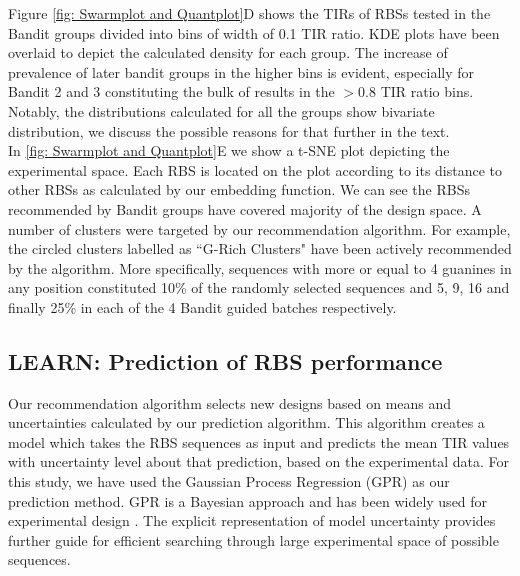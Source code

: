 \documentclass{article}
\begin{document}
Figure \ref{fig: Swarmplot and Quantplot}D shows the TIRs of RBSs tested in the Bandit groups divided into bins of width of 0.1 TIR ratio.
KDE plots have been overlaid to depict the calculated density for each group.
The increase of prevalence of later bandit groups in the higher bins is evident, especially for Bandit 2 and 3 constituting the bulk of results in the $>0.8$ TIR ratio bins.
Notably, the distributions calculated for all the groups show bivariate distribution, we discuss the possible reasons for that further in the text.\\

In \ref{fig: Swarmplot and Quantplot}E we show a t-SNE plot depicting the experimental space.
Each RBS is located on the plot according to its distance to other RBSs as calculated by our embedding function.
We can see the RBSs recommended by Bandit groups have covered majority of the design space. 
A number of clusters were targeted by our recommendation algorithm.
For example, the circled clusters labelled as ``G-Rich Clusters" have been actively recommended by the algorithm.
More specifically, sequences with more or equal to 4 guanines in any position constituted 10\% of the randomly selected sequences and 5, 9, 16 and finally 25\% in each of the 4 Bandit guided batches respectively.

\subsection{LEARN: Prediction of RBS performance}
\label{sec:gp-results}

Our recommendation algorithm selects new designs based on means and uncertainties calculated by our prediction algorithm.
This algorithm creates a model which takes the RBS sequences as input and predicts the mean TIR values with uncertainty level about that prediction, based on the experimental data.
For this study, we have used the Gaussian Process Regression (GPR) as our prediction method.
GPR is a Bayesian approach and has been widely used for experimental design \cite{srinivas2012information, romero_navigating_2013}.
The explicit representation of model uncertainty provides further guide for efficient searching through large experimental space of possible sequences.\\
\end{document}

